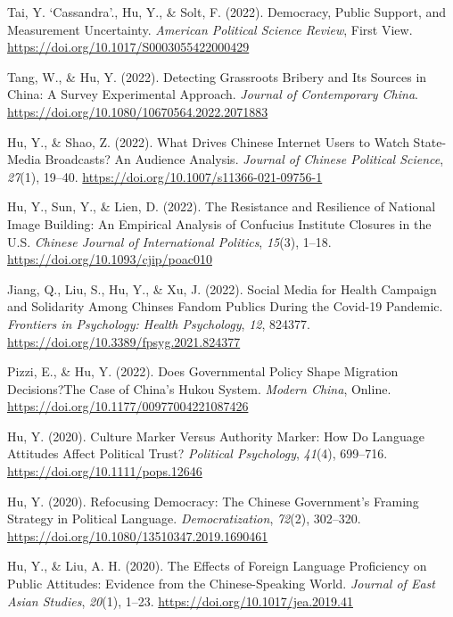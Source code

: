\documentclass[11pt,a4paper,]{awesome-cv}
\begin{document}
\leavevmode{}%
Tai, Y. `Cassandra'., Hu, Y., \& Solt, F. (2022). Democracy, Public
Support, and Measurement Uncertainty. \emph{American Political Science
Review}, First View. \url{https://doi.org/10.1017/S0003055422000429}

\leavevmode{}%
Tang, W., \& Hu, Y. (2022). Detecting Grassroots Bribery and Its Sources
in China: A Survey Experimental Approach. \emph{Journal of Contemporary
China}. \url{https://doi.org/10.1080/10670564.2022.2071883}

\leavevmode{}%
Hu, Y., \& Shao, Z. (2022). What Drives Chinese Internet Users to Watch
State-Media Broadcasts? An Audience Analysis. \emph{Journal of Chinese
Political Science}, \emph{27}(1), 19--40.
\url{https://doi.org/10.1007/s11366-021-09756-1}

\leavevmode{}%
Hu, Y., Sun, Y., \& Lien, D. (2022). The Resistance and Resilience of
National Image Building: An Empirical Analysis of Confucius Institute
Closures in the U.S. \emph{Chinese Journal of International Politics},
\emph{15}(3), 1--18. \url{https://doi.org/10.1093/cjip/poac010}

\leavevmode{}%
Jiang, Q., Liu, S., Hu, Y., \& Xu, J. (2022). Social Media for Health
Campaign and Solidarity Among Chinses Fandom Publics During the Covid-19
Pandemic. \emph{Frontiers in Psychology: Health Psychology}, \emph{12},
824377. \url{https://doi.org/10.3389/fpsyg.2021.824377}

\leavevmode{}%
Pizzi, E., \& Hu, Y. (2022). Does Governmental Policy Shape Migration
Decisions?The Case of China's Hukou System. \emph{Modern China}, Online.
\url{https://doi.org/10.1177/00977004221087426}

\leavevmode{}%
Hu, Y. (2020). Culture Marker Versus Authority Marker: How Do Language
Attitudes Affect Political Trust? \emph{Political Psychology},
\emph{41}(4), 699--716. \url{https://doi.org/10.1111/pops.12646}

\leavevmode{}%
Hu, Y. (2020). Refocusing Democracy: The Chinese Government's Framing
Strategy in Political Language. \emph{Democratization}, \emph{72}(2),
302--320. \url{https://doi.org/10.1080/13510347.2019.1690461}

\leavevmode{}%
Hu, Y., \& Liu, A. H. (2020). The Effects of Foreign Language
Proficiency on Public Attitudes: Evidence from the Chinese-Speaking
World. \emph{Journal of East Asian Studies}, \emph{20}(1), 1--23.
\url{https://doi.org/10.1017/jea.2019.41}
\end{document}
